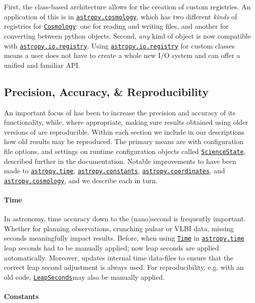 \documentclass[modern]{aastex631}
\newcommand{\astropysubpkg}[1]{\href{http://docs.astropy.org/en/stable/#1/index.html}{\texttt{astropy.#1}}\xspace}
\newcommand{\astropyiosubpkg}[1]{\href{http://docs.astropy.org/en/stable/io/#1/index.html}{\texttt{astropy.io.#1}}\xspace}
\newcommand{\astropycosmology}{\astropysubpkg{cosmology}}
\newcommand{\astropycoordinates}{\astropysubpkg{coordinates}}
\newcommand{\astropyconstants}{\astropysubpkg{constants}}
\newcommand{\astropytime}{\astropysubpkg{time}}
\newcommand{\astropyapi}[2]{\href{https://docs.astropy.org/en/stable/api/astropy.#1.html}{#2}}
\newcommand{\astropyapidoc}[2]{\astropyapi{#1}{\texttt{#2}\xspace}}
\newcommand{\astropyCosmology}{\astropyapidoc{cosmology.Cosmology}{Cosmology}}
\newcommand{\astropyTime}{\astropyapidoc{time.Time}{Time}}
\newcommand{\astropyLeapSeconds}{\astropyapidoc{time.LeapSeconds}{LeapSeconds}}
\newcommand{\astropyScienceState}{\astropyapidoc{utils.state.ScienceState}{ScienceState}}
\begin{document}
    First, the class-based architecture allows for the creation of custom
    registries. An application of this is in \astropycosmology, which has two
    different \textit{kinds} of registries for \astropyCosmology: one for
    reading and writing files, and another for converting between python
    objects. Second, \textit{any} kind of object is now compatible with
    \astropyiosubpkg{registry}. Using \astropyiosubpkg{registry} for custom
    classes means a user does not have to create a whole new I/O system and can
    offer a unified and familiar API.


\subsection*{Precision, Accuracy, \& Reproducibility} \label{sec:core-features-precision_accuracy_repreducibility}

  An important focus of \astropy has been to increase the precision and accuracy
  of its functionality, while, where appropriate, making sure results obtained
  using older versions of \astropypkg are reproducible. Within each section we
  include in our descriptions how old results may be reproduced. The primary
  means are with configuration file options, and settings on runtime
  configuration objects called \astropyScienceState, described further in the
  documentation. Notable improvements to \astropypkg have been made to
  \astropytime, \astropyconstants, \astropycoordinates, and \astropycosmology,
  and we describe each in turn.

  \paragraph{Time}
    In astronomy, time accuracy down to the (nano)second is frequently
    important. Whether for planning observations, crunching pulsar or VLBI data,
    missing seconds meaningfully impact results. Before, when using \astropyTime
    in \astropytime leap seconds had to be manually applied; now leap seconds
    are applied automatically. Moreover, \astropypkg updates internal time
    data-files to ensure that the correct leap second adjustment is always used.
    For reproducibility, e.g. with an old code, \astropyLeapSeconds may also be
    manually applied.

  \paragraph{Constants}
\end{document}
